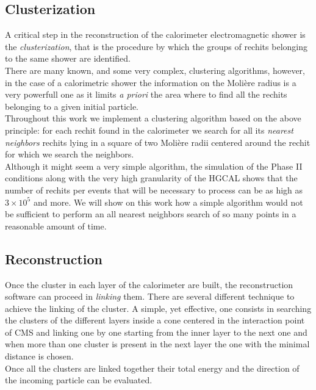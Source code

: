 \subsection{Clusterization}
A critical step in the reconstruction of the calorimeter electromagnetic shower is the \textit{clusterization}, that is the procedure by which the groups of rechits belonging to the same shower are identified.\\
There are many known, and some very complex, clustering algorithms, however, in the case of a calorimetric shower the information on the Molière radius is a very powerfull one as it limits \textit{a priori} the area where to find all the rechits belonging to a given initial particle.\\
Throughout this work we implement a clustering algorithm based on the above principle: for each rechit found in the calorimeter we search for all its \textit{nearest neighbors} rechits lying in a square of two Molière radii centered around the rechit for which we search the neighbors.\\
Although it might seem a very simple algorithm, the simulation of the Phase II conditions along with the very high granularity of the HGCAL shows that the number of rechits per events that will be necessary to process can be as high as $3 \times 10^5$ and more. We will show on this work how a simple algorithm would not be sufficient to perform an all nearest neighbors search of so many points in a reasonable amount of time.

\subsection{Reconstruction}
Once the cluster in each layer of the calorimeter are built, the reconstruction software can proceed in \textit{linking} them. There are several different technique to achieve the linking of the cluster. A simple, yet effective, one consists in searching the clusters of the different layers inside a cone centered in the interaction point of CMS and linking one by one starting from the inner layer to the next one and when more than one cluster is present in the next layer the one with the minimal distance is chosen.\\
Once all the clusters are linked together their total energy and the direction of the incoming particle can be evaluated.

